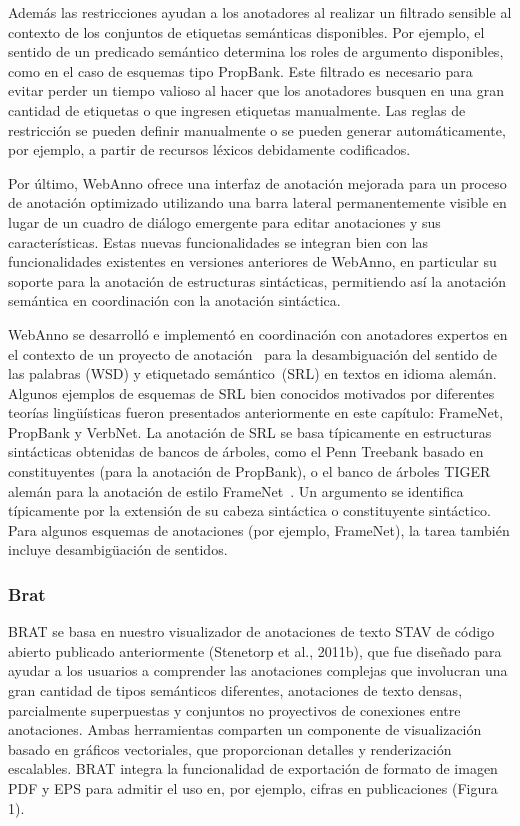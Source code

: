 Además las restricciones ayudan a los anotadores al realizar un filtrado sensible al contexto de los conjuntos de etiquetas semánticas disponibles.
Por ejemplo, el sentido de un predicado semántico determina los roles de argumento disponibles, como en el caso de esquemas tipo PropBank.
Este filtrado es necesario para evitar perder un tiempo valioso al hacer que los anotadores busquen en una gran cantidad de etiquetas o que ingresen etiquetas manualmente.
Las reglas de restricción se pueden definir manualmente o se pueden generar automáticamente, por ejemplo, a partir de recursos léxicos debidamente codificados.

Por último, WebAnno ofrece una interfaz de anotación mejorada para un proceso de anotación optimizado utilizando una barra lateral permanentemente visible en lugar de un cuadro de diálogo emergente para editar anotaciones y sus características.
Estas nuevas funcionalidades se integran bien con las funcionalidades existentes en versiones anteriores de WebAnno, en particular su soporte para la anotación de estructuras sintácticas, permitiendo así la anotación semántica en coordinación con la anotación sintáctica.

WebAnno se desarrolló e implementó en coordinación con anotadores expertos en el contexto de un proyecto de anotación~\cite{Mujdricza-Maydt2016} para la desambiguación del sentido de las palabras (WSD) y etiquetado semántico~(SRL) en textos en idioma alemán.
Algunos ejemplos de esquemas de SRL bien conocidos motivados por diferentes teorías lingüísticas fueron presentados anteriormente en este capítulo: FrameNet, PropBank y VerbNet.
La anotación de SRL se basa típicamente en estructuras sintácticas obtenidas de bancos de árboles, como el Penn Treebank basado en constituyentes (para la anotación de PropBank), o el banco de árboles TIGER alemán para la anotación de estilo FrameNet~\cite{Burchardt2009}.
Un argumento se identifica típicamente por la extensión de su cabeza sintáctica o constituyente sintáctico.
Para algunos esquemas de anotaciones (por ejemplo, FrameNet), la tarea también incluye desambigüación de sentidos.

\subsubsection*{Brat}

BRAT se basa en nuestro visualizador de anotaciones de texto STAV de código abierto publicado anteriormente (Stenetorp et al., 2011b), que fue diseñado para ayudar a los usuarios a comprender las anotaciones complejas que involucran una gran cantidad de tipos semánticos diferentes, anotaciones de texto densas, parcialmente superpuestas y conjuntos no proyectivos de conexiones entre anotaciones. Ambas herramientas comparten un componente de visualización basado en gráficos vectoriales, que proporcionan detalles y renderización escalables. BRAT integra la funcionalidad de exportación de formato de imagen PDF y EPS para admitir el uso en, por ejemplo, cifras en publicaciones (Figura 1).

